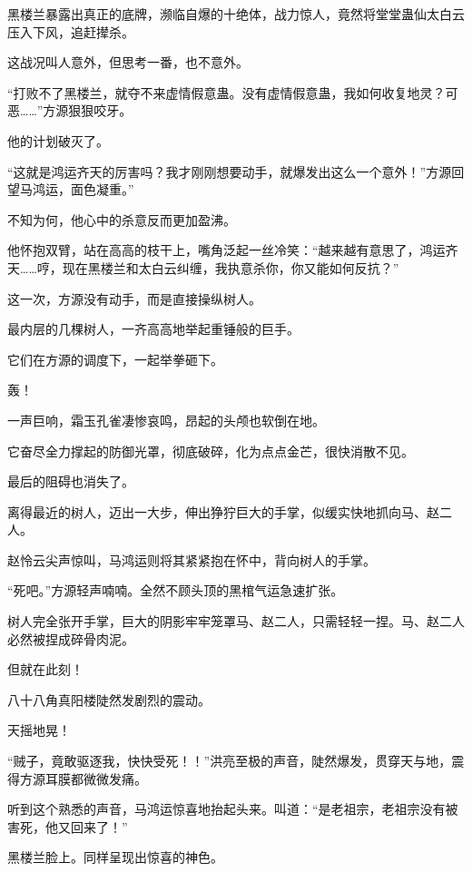 
\begin{this_body}



黑楼兰暴露出真正的底牌，濒临自爆的十绝体，战力惊人，竟然将堂堂蛊仙太白云压入下风，追赶撵杀。

这战况叫人意外，但思考一番，也不意外。

“打败不了黑楼兰，就夺不来虚情假意蛊。没有虚情假意蛊，我如何收复地灵？可恶……”方源狠狠咬牙。

他的计划破灭了。

“这就是鸿运齐天的厉害吗？我才刚刚想要动手，就爆发出这么一个意外！”方源回望马鸿运，面色凝重。”

不知为何，他心中的杀意反而更加盈沸。

他怀抱双臂，站在高高的枝干上，嘴角泛起一丝冷笑：“越来越有意思了，鸿运齐天……哼，现在黑楼兰和太白云纠缠，我执意杀你，你又能如何反抗？”

这一次，方源没有动手，而是直接操纵树人。

最内层的几棵树人，一齐高高地举起重锤般的巨手。

它们在方源的调度下，一起举拳砸下。

轰！

一声巨响，霜玉孔雀凄惨哀鸣，昂起的头颅也软倒在地。

它奋尽全力撑起的防御光罩，彻底破碎，化为点点金芒，很快消散不见。

最后的阻碍也消失了。

离得最近的树人，迈出一大步，伸出狰狞巨大的手掌，似缓实快地抓向马、赵二人。

赵怜云尖声惊叫，马鸿运则将其紧紧抱在怀中，背向树人的手掌。

“死吧。”方源轻声喃喃。全然不顾头顶的黑棺气运急速扩张。

树人完全张开手掌，巨大的阴影牢牢笼罩马、赵二人，只需轻轻一捏。马、赵二人必然被捏成碎骨肉泥。

但就在此刻！

八十八角真阳楼陡然发剧烈的震动。

天摇地晃！

“贼子，竟敢驱逐我，快快受死！！”洪亮至极的声音，陡然爆发，贯穿天与地，震得方源耳膜都微微发痛。

听到这个熟悉的声音，马鸿运惊喜地抬起头来。叫道：“是老祖宗，老祖宗没有被害死，他又回来了！”

黑楼兰脸上。同样呈现出惊喜的神色。


\end{this_body}
